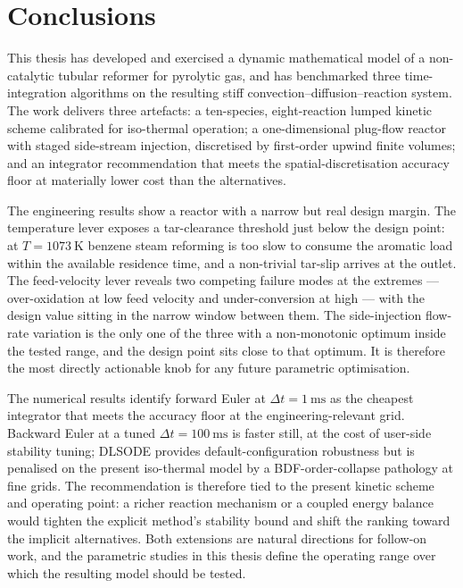 
\chapter*{Conclusions}

This thesis has developed and exercised a dynamic mathematical model of a non-catalytic tubular reformer for pyrolytic gas, and has benchmarked three time-integration algorithms on the resulting stiff convection--diffusion--reaction system. The work delivers three artefacts: a ten-species, eight-reaction lumped kinetic scheme calibrated for iso-thermal operation; a one-dimensional plug-flow reactor with staged side-stream injection, discretised by first-order upwind finite volumes; and an integrator recommendation that meets the spatial-discretisation accuracy floor at materially lower cost than the alternatives.

The engineering results show a reactor with a narrow but real design margin. The temperature lever exposes a tar-clearance threshold just below the design point: at \(T = \SI{1073}{\kelvin}\) benzene steam reforming is too slow to consume the aromatic load within the available residence time, and a non-trivial tar-slip arrives at the outlet. The feed-velocity lever reveals two competing failure modes at the extremes --- over-oxidation at low feed velocity and under-conversion at high --- with the design value sitting in the narrow window between them. The side-injection flow-rate variation is the only one of the three with a non-monotonic optimum inside the tested range, and the design point sits close to that optimum. It is therefore the most directly actionable knob for any future parametric optimisation.

The numerical results identify forward Euler at \(\Delta t = \SI{1}{\milli\second}\) as the cheapest integrator that meets the accuracy floor at the engineering-relevant grid. Backward Euler at a tuned \(\Delta t = \SI{100}{\milli\second}\) is faster still, at the cost of user-side stability tuning; DLSODE provides default-configuration robustness but is penalised on the present iso-thermal model by a BDF-order-collapse pathology at fine grids. The recommendation is therefore tied to the present kinetic scheme and operating point: a richer reaction mechanism or a coupled energy balance would tighten the explicit method's stability bound and shift the ranking toward the implicit alternatives. Both extensions are natural directions for follow-on work, and the parametric studies in this thesis define the operating range over which the resulting model should be tested.
